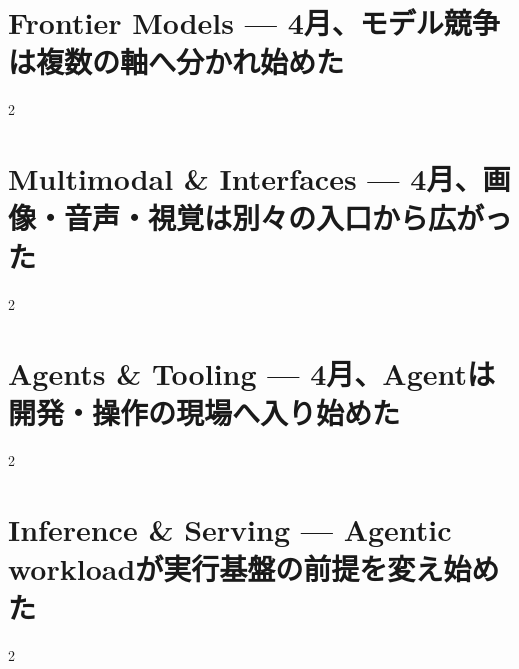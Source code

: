 \documentclass[lualatex,a4paper,11pt]{jlreq}
\begin{document}
\surveycover
\clearpage


\clearpage
\section{Frontier Models — 4月、モデル競争は複数の軸へ分かれ始めた}
\label{pkg:frontier-models-april}
\vspace{0.15em}
\begin{multicols}{2}

\end{multicols}

\medskip


\Needspace{0.45\textheight}
\bigskip
\section{Multimodal \& Interfaces — 4月、画像・音声・視覚は別々の入口から広がった}
\label{pkg:multimodal-interfaces-april}
\vspace{0.15em}
\begin{multicols}{2}

\end{multicols}

\medskip


\Needspace{0.45\textheight}
\bigskip
\section{Agents \& Tooling — 4月、Agentは開発・操作の現場へ入り始めた}
\label{pkg:agents-tooling-april}
\vspace{0.15em}
\begin{multicols}{2}

\end{multicols}

\medskip


\Needspace{0.45\textheight}
\bigskip
\section{Inference \& Serving — Agentic workloadが実行基盤の前提を変え始めた}
\label{pkg:inference-serving-april}
\vspace{0.15em}
\begin{multicols}{2}

\end{multicols}

\medskip

\end{document}
